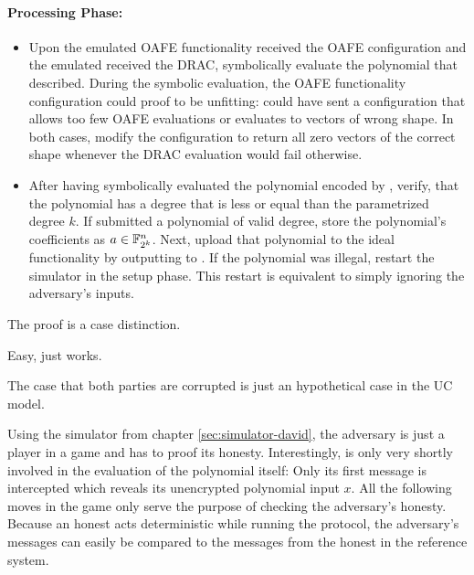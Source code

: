 \paragraph{Processing Phase:}

\begin{itemize}

  \item Upon the emulated OAFE functionality received the OAFE configuration and
    the emulated \JWpTwo{} received the DRAC, symbolically evaluate the
    polynomial that \JWadv{} described. During the symbolic evaluation, the OAFE
    functionality configuration could proof to be unfitting: \JWadv{} could
    have sent a configuration that allows too few OAFE evaluations or evaluates
    to vectors of wrong shape. In both cases, modify the configuration to return
    all zero vectors of the correct shape whenever the DRAC evaluation would
    fail otherwise.

  \item After having symbolically evaluated the polynomial encoded by \JWadv{},
    verify, that the polynomial has a degree that is less or equal than the
    parametrized degree $k$. If \JWadv{} submitted a polynomial of valid degree,
    store the polynomial's coefficients as $a \in \mathbb{F}_{2^k}^n$.  Next,
    upload that polynomial to the ideal functionality \JWfuncSymOPEnp{} by
    outputting  to \JWfuncSymOPEnp{}.  If the polynomial
    was illegal, restart the simulator in the setup phase.  This restart is
    equivalent to simply ignoring the adversary's inputs.

\end{itemize}


%
%
\label{sec:proof}

The proof is a case distinction.



Easy, just works.




The case that both parties are corrupted is just an hypothetical case in the UC
model.



Using the simulator from chapter \ref{sec:simulator-david}, the adversary
\JWadv{} is just a player in a game and has to proof its honesty. Interestingly,
\JWadv{} is only very shortly involved in the evaluation of the polynomial
itself: Only its first message is intercepted which reveals its unencrypted
polynomial input $x$. All the following moves in the game only serve the purpose
of checking the adversary's honesty. Because an honest \JWpTwo{} acts
deterministic while running the protocol, the adversary's messages can easily be
compared to the messages from the honest \JWpTwo{} in the reference system.

